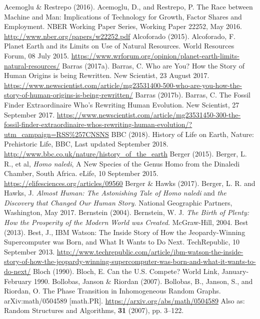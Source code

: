 \begin{multicols}{2}
\begin{thebibliography}{99}
 Acemoglu \& Restrepo (2016). Acemoglu, D., and Restrepo, P. The Race between Machine and Man: Implications of Technology for Growth, Factor Shares and Employment. NBER Working Paper Series, Working Paper 22252, May 2016. \url{http://www.nber.org/papers/w22252.pdf}
 Alcoforado (2015). Alcoforado, F. Planet Earth and its Limits on Use of Natural Resources. World Resources Forum, 08 July 2015. \url{https://www.wrforum.org/opinion/planet-earth-limits-natural-resources/}
 Barras (2017a). Barras, C. Who are You? How the Story of Human Origins is being Rewritten. New Scientist, 23 August 2017. \url{https://www.newscientist.com/article/mg23531400-500-who-are-you-how-the-story-of-human-origins-is-being-rewritten/}
 Barras (2017b). Barras, C. The Fossil Finder Extraordinaire Who's Rewriting Human Evolution. New Scientist, 27 September 2017. \url{https://www.newscientist.com/article/mg23531450-300-the-fossil-finder-extraordinaire-whos-rewriting-human-evolution/?utm_campaign=RSS%257CNSNS}
 BBC (2018). History of Life on Earth, Nature: Prehistoric Life, BBC, Last updated September 2018. \url{http://www.bbc.co.uk/nature/history_of_the_earth}
 Berger (2015). Berger, L. R., et al, \textit{Homo naledi}, A New Species of the Genus Homo from the Dinaledi Chamber, South Africa. eLife, 10 September 2015. \url{https://elifesciences.org/articles/09560}
 Berger \& Hawks (2017). Berger, L. R. and Hawks, J. \textit{Almost Human: The Astonishing Tale of Homo naledi} and \textit{the Discovery that Changed Our Human Story.} National Geographic Partners, Washington, May 2017.
 Bernstein (2004). Bernstein, W. J. \textit{The Birth of Plenty: How the Prosperity of the Modern World was Created.} McGraw-Hill, 2004.
 Best (2013). Best, J., IBM Watson: The Inside Story of How the Jeopardy-Winning Supercomputer was Born, and What It Wants to Do Next. TechRepublic, 10 September 2013. \url{http://www.techrepublic.com/article/ibm-watson-the-inside-story-of-how-the-jeopardy-winning-supercomputer-was-born-and-what-it-wants-to-do-next/}
 Bloch (1990). Bloch, E. Can the U.S. Compete? World Link, January-February 1990.
 Bollobas, Janson \& Riordan (2007). Bollobas, B., Janson, S., and Riordan, O. The Phase Transition in Inhomogeneous Random Graphs. arXiv:math/0504589 [math.PR]. \url{https://arxiv.org/abs/math/0504589} Also as: Random Structures and Algorithms, \textbf{31} (2007), pp. 3--122.

\end{thebibliography}
\end{multicols}
